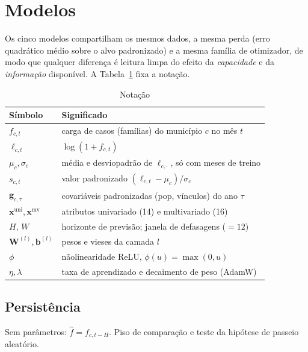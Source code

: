 \documentclass[12pt,a4paper,oneside]{article}
\begin{document}
\section{Modelos}
\label{sec:modelos}

Os cinco modelos compartilham os mesmos dados, a mesma perda (erro
quadrático médio sobre o alvo padronizado) e a mesma família de
otimizador, de modo que qualquer diferença é leitura limpa do efeito da
\emph{capacidade} e da \emph{informação} disponível. A
Tabela~\ref{tab:notacao} fixa a notação.

\begin{table}[H]
\centering
\caption{Notação}
\label{tab:notacao}
\small
\begin{tabular}{@{}ll@{}}
\toprule
\textbf{Símbolo} & \textbf{Significado} \\
\midrule
$f_{c,t}$               & carga de casos (famílias) do município $c$ no mês $t$ \\
$\ell_{c,t}$            & $\log(1+f_{c,t})$ \\
$\mu_c,\sigma_c$        & média e desvio\-padrão de $\ell_{c,\cdot}$, só com meses de treino \\
$s_{c,t}$               & valor padronizado $(\ell_{c,t}-\mu_c)/\sigma_c$ \\
$\bm g_{c,\tau}$        & covariáveis padronizadas (pop, vínculos) do ano $\tau$ \\
$\bm x^{\text{uni}},\bm x^{\text{mv}}$ & atributos univariado (14) e multivariado (16) \\
$H,\,W$                 & horizonte de previsão; janela de defasagens ($=12$) \\
$\bm W^{(l)},\bm b^{(l)}$ & pesos e vieses da camada $l$ \\
$\phi$                  & não\-linearidade ReLU, $\phi(u)=\max(0,u)$ \\
$\eta,\lambda$          & taxa de aprendizado e decaimento de peso (AdamW) \\
\bottomrule
\end{tabular}
\end{table}

\subsection{Persistência}

Sem parâmetros: $\widehat{f}=f_{c,t-H}$. Piso de comparação e teste da
hipótese de passeio aleatório.
\end{document}
